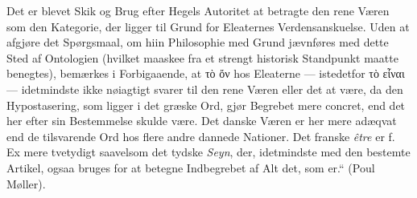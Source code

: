\documentclass[12pt]{book}
\newcommand{\dsi}{\textup{ɔ:}}
\newcommand{\opage}[1]{\marginnote{\footnotesize\textit{[#1]}}}
\begin{document}
Det er blevet Skik og Brug efter Hegels Autoritet at betragte den rene Væren som den
Kategorie, der ligger til Grund for Eleaternes Verdensanskuelse. Uden at afgjøre det
Spørgsmaal, om hiin Philosophie med Grund jævnføres med
\opage{116} %
dette Sted af Ontologien (hvilket maaskee fra et strengt historisk Standpunkt maatte
benegtes), bemærkes i Forbigaaende, at τὸ ὄν hos Eleaterne --- istedetfor τὸ εἶναι
--- idetmindste ikke nøiagtigt svarer til den rene Væren eller det at være, da den
Hypostasering, som ligger i det græske Ord, gjør Begrebet mere concret, end det her
efter sin Bestemmelse skulde være. Det danske Væren er her mere adæqvat end de
tilsvarende Ord hos flere andre dannede Nationer. Det franske \textit{être} er f. Ex
mere tvetydigt saavelsom det tydske \emph{Seyn}, der, idetmindste med den bestemte
Artikel, ogsaa bruges for at betegne Indbegrebet af Alt det, som er.“ (Poul Møller).
\end{document}
